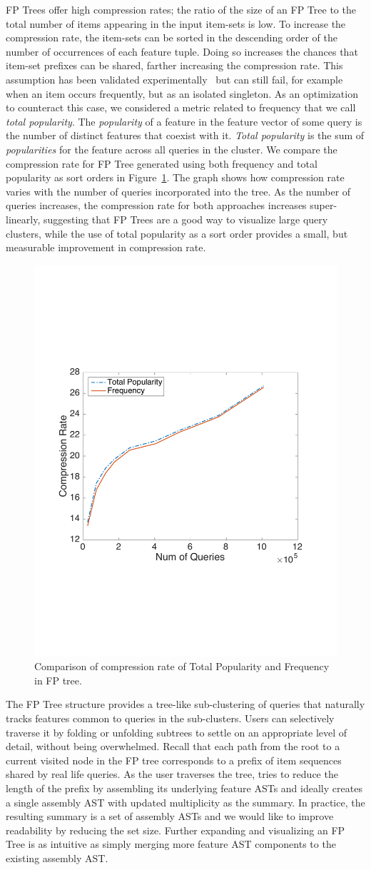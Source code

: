 FP Trees offer high compression rates; the ratio of the size of an FP Tree to the total number of items appearing in the input item-sets is low.
To increase the compression rate, the item-sets can be sorted in the descending order of the number of occurrences of each feature tuple.  Doing so increases the chances that item-set prefixes can be shared, farther increasing the compression rate. 
This assumption has been validated experimentally~\cite{han2004mining} but can still fail, for example when an item occurs frequently, but as an isolated singleton.  As an optimization to counteract this case, we considered a metric related to frequency that we call \textit{total popularity}.  The \textit{popularity} of a feature in the feature vector of some query is the number of distinct features that coexist with it. \textit{Total popularity} is the sum of \textit{popularities} for the feature across all queries in the cluster. 
We compare the compression rate for FP Tree generated using both frequency and total popularity as sort orders in Figure~\ref{fig:compression_rate}.  
The graph shows how compression rate varies with the number of queries incorporated into the tree. 
As the number of queries increases, the compression rate for both approaches increases super-linearly, suggesting that FP Trees are a good way to visualize large query clusters, while the use of total popularity as a sort order provides a small, but measurable improvement in compression rate.

\begin{figure}[h!]
\centering
\includegraphics[height=5 cm]{graphics/compression_rate_scissored}
\caption{Comparison of compression rate of Total Popularity and Frequency in FP tree.}
\label{fig:compression_rate}
\end{figure}

The FP Tree structure provides a tree-like sub-clustering of queries that naturally tracks features common to queries in the sub-clusters.  Users can selectively traverse it by folding or unfolding subtrees to settle on an appropriate level of detail, without being overwhelmed.
Recall that each path from the root to a current visited node in the FP tree corresponds to a prefix of item sequences shared by real life queries. 
As the user traverses the tree, \sysname{} tries to reduce the length of the prefix by assembling its underlying feature ASTs and ideally creates a single assembly AST with updated multiplicity as the summary. In practice, the resulting summary is a set of assembly ASTs and we would like to improve readability by reducing the set size. Further expanding and visualizing an FP Tree is as intuitive as simply merging more feature AST components to the existing assembly AST. 

